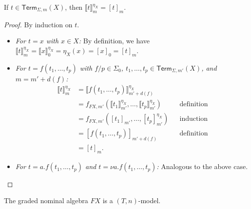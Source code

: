 \documentclass[a4paper,UKenglish,cleveref,thm-restate,numberwithinsect,final]{lipics-v2021}
\newcommand{\Term}{\mathsf{Term}}
\newcommand{\sig}{\Sigma}
\newcommand{\sigp}{\Sigma_0}
\theoremstyle{plain}
\numberwithin{equation}{section}
\newcommand{\+}[1]{\mathcal{#1}\xspace}
\theoremstyle{definition}
\begin{document}
\begin{lemma}\label{thm:canonicalenvironmentevaluation}
    If \(t \in \Term_{\sig, m}(X)\), then \(\llbracket t \rrbracket^{\eta_X}_m = [t]_m\).
\end{lemma}

\begin{proof}
    By induction on \(t\).
    \begin{itemize}
        \item
            \textit{For \(t = x\) with \(x \in X\):}
            By definition, we have \(\llbracket t \rrbracket^{\eta_X}_m = \llbracket x \rrbracket^{\eta_X}_0 = \eta_X(x) = [x]_0 = [t]_m\).
        \item
            \textit{For \(t = f(t_1, \ldots, t_p)\) with \(f/p \in \sigp\), \(t_1, \ldots, t_p \in \Term_{\sig, m'}(X)\), and \(m = m' + d(f)\):}
            \begin{align*}
                \llbracket t \rrbracket^{\eta_X}_m
                &= \llbracket f(t_1, \ldots, t_p) \rrbracket^{\eta_X}_{m' + d(f)} \\
                &= f_{FX, m'}(\llbracket t_1 \rrbracket^{\eta_X}_{m'}, \ldots, \llbracket t_p \rrbracket^{\eta_X}_{m'}) && \text{definition} \\
                &= f_{FX, m'}([t_1]_{m'}, \ldots, [t_p]^{\eta_X}_{m'}) && \text{induction} \\
                &= [f(t_1, \ldots, t_p)]_{m' + d(f)} && \text{definition} \\
                &= [t]_m.
            \end{align*}
        \item
            \textit{For \(t = a.f(t_1, \ldots, t_p)\) and \(t = \nu a.f(t_1, \ldots, t_p)\):}
            Analogous to the above case.
          \end{itemize}

\end{proof}

\begin{lemma}
    The graded nominal algebra \(FX\) is a \((T, n)\)-model.
\end{lemma}
\end{document}
